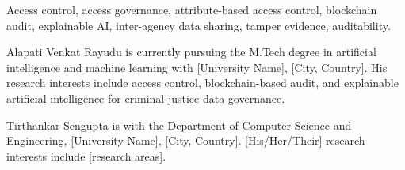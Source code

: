 \documentclass[journal]{IEEEtran}
\begin{document}
\begin{IEEEkeywords}
Access control, access governance, attribute-based access control, blockchain
audit, explainable AI, inter-agency data sharing, tamper evidence,
auditability.
\end{IEEEkeywords}

\IEEEpeerreviewmaketitle



% 
% 
% 
% 
% 

\balance



\begin{IEEEbiographynophoto}{Alapati Venkat Rayudu}
is currently pursuing the M.Tech degree in artificial intelligence and
machine learning with [University Name], [City, Country]. His research
interests include access control, blockchain-based audit, and explainable
artificial intelligence for criminal-justice data governance.
\end{IEEEbiographynophoto}

\begin{IEEEbiographynophoto}{Tirthankar Sengupta}
is with the Department of Computer Science and Engineering,
[University Name], [City, Country]. [His/Her/Their] research interests
include [research areas].
\end{IEEEbiographynophoto}
\end{document}
